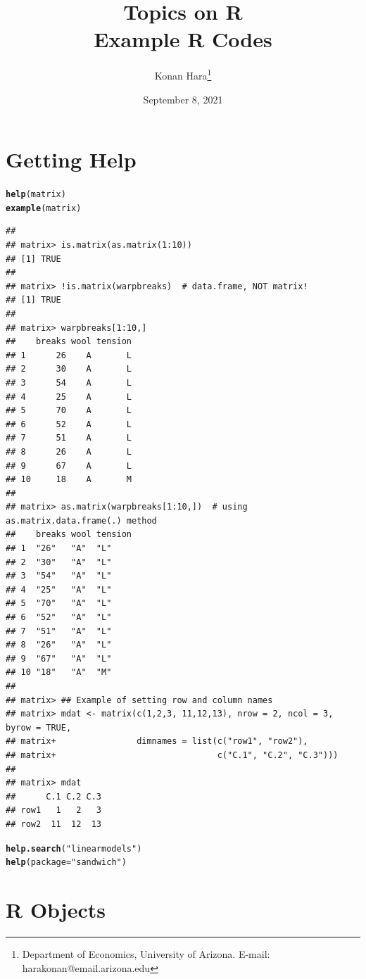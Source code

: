 \documentclass[11pt]{article}\usepackage[]{graphicx}\usepackage[]{color}
\title{Topics on R\\Example R Codes}
\author{Konan Hara\footnote{Department of Economics, University of Arizona. E-mail: harakonan@email.arizona.edu}}
\date{September 8, 2021}
\makeatletter
\newcommand{\hlstr}[1]{\textcolor[rgb]{0.192,0.494,0.8}{#1}}%
\newcommand{\hlstd}[1]{\textcolor[rgb]{0.345,0.345,0.345}{#1}}%
\newcommand{\hlkwc}[1]{\textcolor[rgb]{0.333,0.667,0.333}{#1}}%
\newcommand{\hlkwd}[1]{\textcolor[rgb]{0.737,0.353,0.396}{\textbf{#1}}}%
\newenvironment{kframe}{%
 \def\at@end@of@kframe{}%
 \ifinner\ifhmode%
  \def\at@end@of@kframe{\end{minipage}}%
  \begin{minipage}{\columnwidth}%
 \fi\fi%
 \def\FrameCommand##1{\hskip\@totalleftmargin \hskip-\fboxsep
 \colorbox{shadecolor}{##1}\hskip-\fboxsep
     \hskip-\linewidth \hskip-\@totalleftmargin \hskip\columnwidth}%
 \MakeFramed {\advance\hsize-\width
   \@totalleftmargin\z@ \linewidth\hsize
   \@setminipage}}%
 {\par\unskip\endMakeFramed%
 \at@end@of@kframe}
\newenvironment{knitrout}{}{} %
\makeatother
\begin{document}
\maketitle{}



\section{Getting Help}

\begin{knitrout}
\color{fgcolor}\begin{kframe}
\begin{alltt}
\hlkwd{help}\hlstd{(matrix)}
\hlkwd{example}\hlstd{(matrix)}
\end{alltt}
\begin{verbatim}
## 
## matrix> is.matrix(as.matrix(1:10))
## [1] TRUE
## 
## matrix> !is.matrix(warpbreaks)  # data.frame, NOT matrix!
## [1] TRUE
## 
## matrix> warpbreaks[1:10,]
##    breaks wool tension
## 1      26    A       L
## 2      30    A       L
## 3      54    A       L
## 4      25    A       L
## 5      70    A       L
## 6      52    A       L
## 7      51    A       L
## 8      26    A       L
## 9      67    A       L
## 10     18    A       M
## 
## matrix> as.matrix(warpbreaks[1:10,])  # using as.matrix.data.frame(.) method
##    breaks wool tension
## 1  "26"   "A"  "L"    
## 2  "30"   "A"  "L"    
## 3  "54"   "A"  "L"    
## 4  "25"   "A"  "L"    
## 5  "70"   "A"  "L"    
## 6  "52"   "A"  "L"    
## 7  "51"   "A"  "L"    
## 8  "26"   "A"  "L"    
## 9  "67"   "A"  "L"    
## 10 "18"   "A"  "M"    
## 
## matrix> ## Example of setting row and column names
## matrix> mdat <- matrix(c(1,2,3, 11,12,13), nrow = 2, ncol = 3, byrow = TRUE,
## matrix+                dimnames = list(c("row1", "row2"),
## matrix+                                c("C.1", "C.2", "C.3")))
## 
## matrix> mdat
##      C.1 C.2 C.3
## row1   1   2   3
## row2  11  12  13
\end{verbatim}
\begin{alltt}
\hlkwd{help.search}\hlstd{(}\hlstr{"linearmodels"}\hlstd{)}
\hlkwd{help}\hlstd{(}\hlkwc{package}\hlstd{=}\hlstr{"sandwich"}\hlstd{)}
\end{alltt}
\end{kframe}
\end{knitrout}

\section{R Objects}
\end{document}
